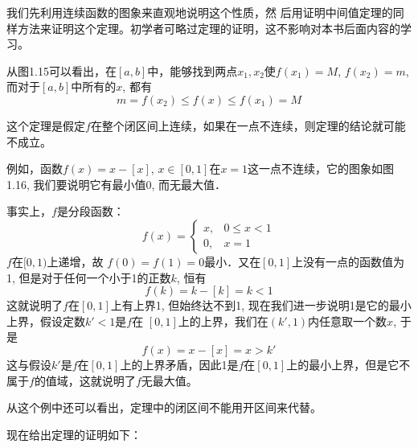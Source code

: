 我们先利用连续函数的图象来直观地说明这个性质，然
后用证明中间值定理的同样方法来证明这个定理。初学者可略过定理的证明，这不影响对本书后面内容的学习。

从图1.15可以看出，在$[a,b]$中，能够找到两点$x_1,x_2$使$f(x_1)=M$, $f(x_2)=m$, 而对于$[a,b]$中所有的$x$, 都有
\[m=f(x_2)\le f(x)\le f(x_1)=M\]

\begin{rmk}
    这个定理是假定$f$在整个闭区间上连续，如果在一点不连续，则定理的结论就可能不成立。
\end{rmk}

例如，函数$f(x)=x-[x]$, $x\in [0, 1]$在$x=1$这一点不连续，它的图象如图1.16, 我们要说明它有最小值0, 而无最大值．

事实上，$f$是分段函数：
\[f(x)=\begin{cases}
    x,& 0\le x<1\\
    0,& x=1
\end{cases}\]
$f$在$[0, 1)$上递增，故
$f(0)=f(1)=0$最小．又在$[0, 1]$上没有一点的函数值为1, 但是对于任何一个小于1的正数$k$, 恒有
\[f (k) =k- [k] =k<1\]
这就说明了$f$在$[0, 1]$上有上界1, 但始终达不到1, 现在我们进一步说明1是它的最小上界，假设定数$k'<1$是$f$在
$[0, 1]$上的上界，我们在$(k',1)$内任意取一个数$x$, 于是
\[f (x) =x- [x] =x> k'\]
这与假设$k'$是$f$在$[0, 1]$上的上界矛盾，因此1是$f$在$[0, 1]$上的最小上界，但是它不属于$f$的值域，这就说明了$f$无最大值。

从这个例中还可以看出，定理中的闭区间不能用开区间来代替。

现在给出定理的证明如下：

